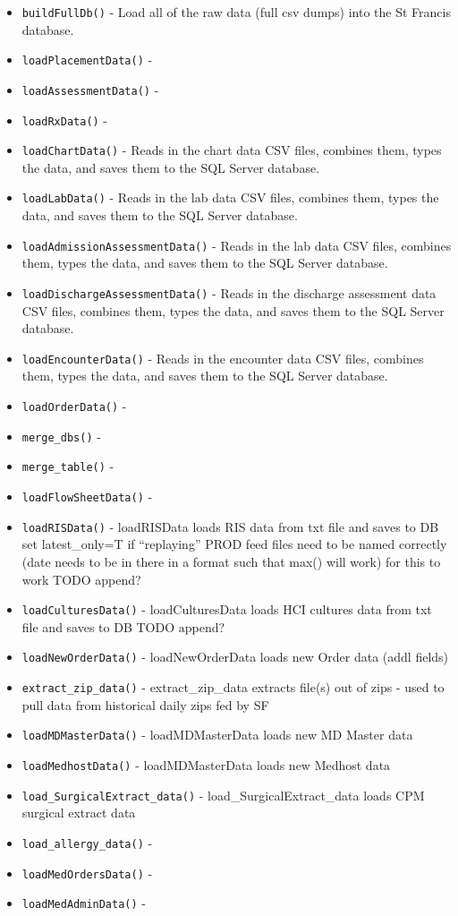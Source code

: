 \documentclass[
]{book}
\providecommand{\tightlist}{%
  \setlength{\itemsep}{0pt}\setlength{\parskip}{0pt}}
\begin{document}
\begin{itemize}
\tightlist
\item
  \texttt{buildFullDb()} - Load all of the raw data (full csv dumps) into the St Francis database.
\item
  \texttt{loadPlacementData()} -
\item
  \texttt{loadAssessmentData()} -
\item
  \texttt{loadRxData()} -
\item
  \texttt{loadChartData()} - Reads in the chart data CSV files, combines them, types the data, and saves them to the SQL Server database.
\item
  \texttt{loadLabData()} - Reads in the lab data CSV files, combines them, types the data, and saves them to the SQL Server database.
\item
  \texttt{loadAdmissionAssessmentData()} - Reads in the lab data CSV files, combines them, types the data, and saves them to the SQL Server database.
\item
  \texttt{loadDischargeAssessmentData()} - Reads in the discharge assessment data CSV files, combines them, types the data, and saves them to the SQL Server database.
\item
  \texttt{loadEncounterData()} - Reads in the encounter data CSV files, combines them, types the data, and saves them to the SQL Server database.
\item
  \texttt{loadOrderData()} -
\item
  \texttt{merge\_dbs()} -
\item
  \texttt{merge\_table()} -
\item
  \texttt{loadFlowSheetData()} -
\item
  \texttt{loadRISData()} - loadRISData loads RIS data from txt file and saves to DB set latest\_only=T if ``replaying'' PROD feed files need to be named correctly (date needs to be in there in a format such that max() will work) for this to work TODO append?
\item
  \texttt{loadCulturesData()} - loadCulturesData loads HCI cultures data from txt file and saves to DB TODO append?
\item
  \texttt{loadNewOrderData()} - loadNewOrderData loads new Order data (addl fields)
\item
  \texttt{extract\_zip\_data()} - extract\_zip\_data extracts file(s) out of zips - used to pull data from historical daily zips fed by SF
\item
  \texttt{loadMDMasterData()} - loadMDMasterData loads new MD Master data
\item
  \texttt{loadMedhostData()} - loadMDMasterData loads new Medhost data
\item
  \texttt{load\_SurgicalExtract\_data()} - load\_SurgicalExtract\_data loads CPM surgical extract data
\item
  \texttt{load\_allergy\_data()} -
\item
  \texttt{loadMedOrdersData()} -
\item
  \texttt{loadMedAdminData()} -
\end{itemize}
\end{document}
